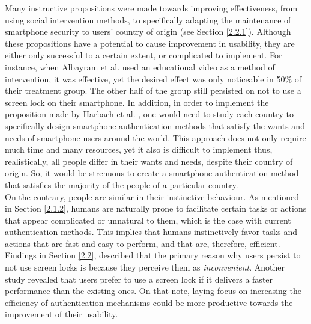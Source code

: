 Many instructive propositions were made towards improving effectiveness, from using social intervention methods, to specifically adapting the maintenance of smartphone security to users' country of origin (see Section \ref{2.2.1}). Although these propositions have a potential to cause improvement in usability, they are either only successful to a certain extent, or complicated to implement. For instance, when Albayram et al. \cite{Albayram:2017:BUL:3235924.3235929} used an educational video as a method of intervention, it was effective, yet the desired effect was only noticeable in 50\% of their treatment group. The other half of the group still persisted on not to use a screen lock on their smartphone. In addition, in order to implement the proposition made by Harbach et al. \cite{Harbach:2016}, one would need to study each country to specifically design smartphone authentication methods that satisfy the wants and needs of smartphone users around the world. This approach does not only require much time and many resources, yet it also is difficult to implement thus, realistically, all people differ in their wants and needs, despite their country of origin. So, it would be strenuous to create a smartphone authentication method that satisfies the majority of the people of a particular country. \\

On the contrary, people are similar in their instinctive behaviour. As mentioned in Section \ref{2.1.2}, humans are naturally prone to facilitate certain tasks or actions that appear complicated or unnatural to them, which is the case with current authentication methods. This implies that humans instinctively favor tasks and actions that are fast and easy to perform, and that are, therefore, efficient. Findings in Section \ref{2.2}, described that the primary reason why users persist to not use screen locks is because they perceive them as \textit{inconvenient}. Another study revealed that users prefer to use a screen lock if it delivers a faster performance than the existing ones. On that note, laying focus on increasing the efficiency of authentication mechanisms could be more productive towards the improvement of their usability. \\

